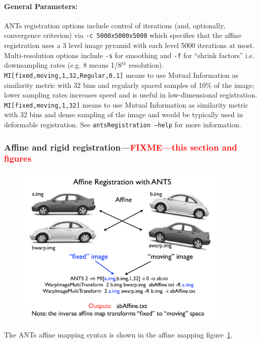 \documentclass{InsightArticle}
\begin{document}
\paragraph{General Parameters:} ANTs registration options include control of iterations (and,
optionally, convergence criterion) via
\texttt{-c 5000x5000x5000} which specifies that the affine registration
uses a 3 level image pyramid with each level 5000 iterations at
most.  Multi-resolution options include \texttt{-s} for smoothing and
\texttt{-f} for ``shrink factors'' i.e. downsampling rates (e.g. 8
means 1/8$^{th}$ resolution).  
\texttt{MI[fixed,moving,1,32,Regular,0.1]} means to use Mutual
Information as similarity metric with 32 bins and regularly spaced
samples of 10\% of the image; lower sampling rates increases speed and
is useful in low-dimensional registration.  \texttt{MI[fixed,moving,1,32]} means to use Mutual
Information as similarity metric with 32 bins and dense sampling of
the image and would be typically used in deformable registration. See \texttt{antsRegistration --help}
for more information. 

\subsubsection{Affine and rigid
  registration---\textcolor{red}{FIXME---this section and figures}}


\begin{figure}
\includegraphics[width=0.9\textwidth]{./Figures/ANTSanatomy.pdf} 
\vspace{-0.1in}
\label{fig:aff}
\end{figure}
The ANTs affine mapping syntax is shown in the affine mapping
figure~\ref{fig:aff}. 
\end{document}
